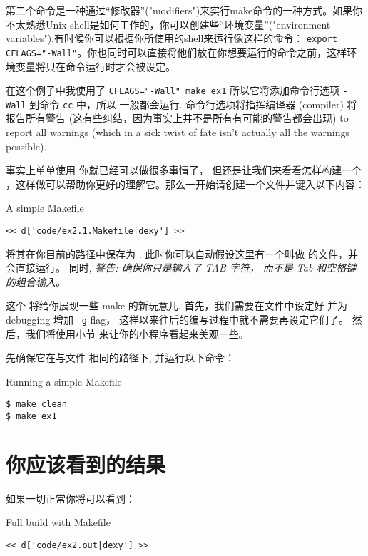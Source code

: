 第二个命令是一种通过“修改器”("modifiers")来实行make命令的一种方式。如果你不太熟悉Unix shell是如何工作的，你可以创建些“环境变量”("environment variables").有时候你可以根据你所使用的shell来运行像这样的命令： \verb|export CFLAGS="-Wall"|。你也同时可以直接将他们放在你想要运行的命令之前，这样环境变量将只在命令运行时才会被设定。

在这个例子中我使用了 \verb|CFLAGS="-Wall" make ex1| 所以它将添加命令行选项 \verb|-Wall| 到命令 \verb|cc| 中，所以
 一般都会运行.  命令行选项将指挥编译器 (compiler)
 将报告所有警告 (这有些纠结，因为事实上并不是所有有可能的警告都会出现) to report all warnings (which in a sick twist of fate isn't
actually all the warnings possible).

事实上单单使用  你就已经可以做很多事情了， 但还是让我们来看看怎样构建一个  ，这样做可以帮助你更好的理解它。那么一开始请创建一个文件并键入以下内容：

\begin{code}{A simple Makefile}
\begin{lstlisting}
<< d['code/ex2.1.Makefile|dexy'] >>
\end{lstlisting}
\end{code}

将其在你目前的路径中保存为 . 此时你可以自动假设这里有一个叫做  的文件，并会直接运行。 同时, \emph{警告: 确保你只是输入了 TAB 字符， 而不是 Tab 和空格键的组合输入。}

这个  将给你展现一些 make 的新玩意儿. 首先，我们需要在文件中设定好  并为 debugging 增加 \verb|-g| flag， 这样以来往后的编写过程中就不需要再设定它们了。 然后，我们将使用小节  来让你的小程序看起来美观一些。

先确保它在与文件  相同的路径下, 并运行以下命令：

\begin{Terminal}{Running a simple Makefile}
\begin{lstlisting}
$ make clean
$ make ex1
\end{lstlisting}
\end{Terminal}


\section{你应该看到的结果}

如果一切正常你将可以看到：

\begin{Terminal}{Full build with Makefile}
\begin{lstlisting}
<< d['code/ex2.out|dexy'] >>
\end{lstlisting}
\end{Terminal}

